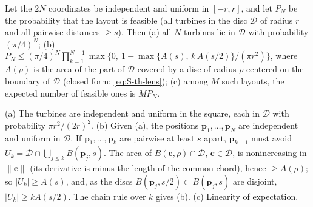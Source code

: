 \begin{thS}
\label{prop:S-box}
\sloppy
Let the $2N$ coordinates be independent and uniform in $[-r,r]$, and let $P_N$ be the probability that the layout is feasible (all turbines in the disc $\mathcal D$ of radius $r$ and all pairwise distances $\ge s$). Then (a) all $N$ turbines lie in $\mathcal D$ with probability $(\pi/4)^N$; (b) $P_N\le(\pi/4)^N\prod_{k=1}^{N-1}\max\bigl\{0,\ 1-\max\{A(s),\,k\,A(s/2)\}/(\pi r^2)\bigr\}$, where $A(\rho)$ is the area of the part of $\mathcal D$ covered by a disc of radius $\rho$ centered on the boundary of $\mathcal D$ (closed form: \eqref{eq:S-th-lens}); (c) among $M$ such layouts, the expected number of feasible ones is $MP_N$.
\end{thS}
\begin{thSproof}
(a) The turbines are independent and uniform in the square, each in $\mathcal D$ with probability $\pi r^2/(2r)^2$. (b) Given (a), the positions $\mathbf p_1,\ldots,\mathbf p_N$ are independent and uniform in $\mathcal D$. If $\mathbf p_1,\ldots,\mathbf p_k$ are pairwise at least $s$ apart, $\mathbf p_{k+1}$ must avoid $U_k=\mathcal D\cap\bigcup_{j\le k}B(\mathbf p_j,s)$. The area of $B(\mathbf c,\rho)\cap \mathcal D$, $\mathbf c\in \mathcal D$, is nonincreasing in $\lVert\mathbf c\rVert$ (its derivative is minus the length of the common chord), hence $\ge A(\rho)$; so $\lvert U_k\rvert\ge A(s)$, and, as the discs $B(\mathbf p_j,s/2)\subset B(\mathbf p_j,s)$ are disjoint, $\lvert U_k\rvert\ge kA(s/2)$. The chain rule over $k$ gives (b). (c) Linearity of expectation.
\end{thSproof}


